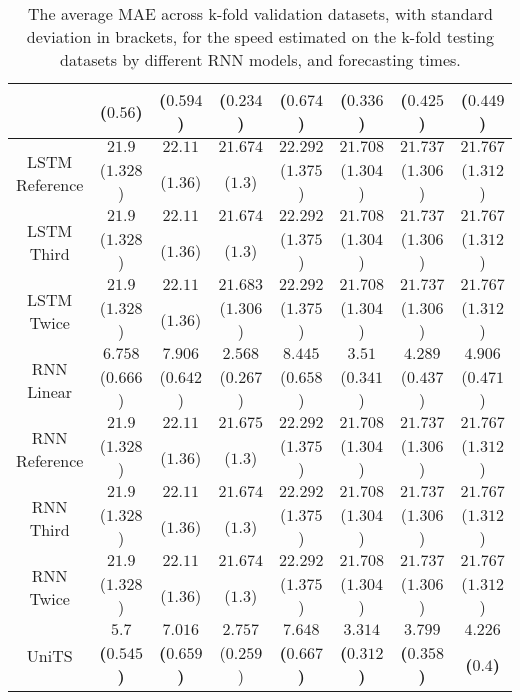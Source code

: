 \begin{table}[!ht]
{\begin{tabular}{|c|c|c|c|c|c|c|c|}
			 & ($0.56$) & ($0.594$) & \textbf{(}$\mathbf{0.234}$\textbf{)} & ($0.674$) & ($0.336$) & ($0.425$) & ($0.449$) \\ \hline
			\multirow{2}{*}{LSTM Reference} & $21.9$ & $22.11$ & $21.674$ & $22.292$ & $21.708$ & $21.737$ & $21.767$ \\
			 & ($1.328$) & ($1.36$) & ($1.3$) & ($1.375$) & ($1.304$) & ($1.306$) & ($1.312$) \\ \hline
			\multirow{2}{*}{LSTM Third} & $21.9$ & $22.11$ & $21.674$ & $22.292$ & $21.708$ & $21.737$ & $21.767$ \\
			 & ($1.328$) & ($1.36$) & ($1.3$) & ($1.375$) & ($1.304$) & ($1.306$) & ($1.312$) \\ \hline
			\multirow{2}{*}{LSTM Twice} & $21.9$ & $22.11$ & $21.683$ & $22.292$ & $21.708$ & $21.737$ & $21.767$ \\
			 & ($1.328$) & ($1.36$) & ($1.306$) & ($1.375$) & ($1.304$) & ($1.306$) & ($1.312$) \\ \hline
			\multirow{2}{*}{RNN Linear} & $6.758$ & $7.906$ & $2.568$ & $8.445$ & $3.51$ & $4.289$ & $4.906$ \\
			 & ($0.666$) & ($0.642$) & ($0.267$) & ($0.658$) & ($0.341$) & ($0.437$) & ($0.471$) \\ \hline
			\multirow{2}{*}{RNN Reference} & $21.9$ & $22.11$ & $21.675$ & $22.292$ & $21.708$ & $21.737$ & $21.767$ \\
			 & ($1.328$) & ($1.36$) & ($1.3$) & ($1.375$) & ($1.304$) & ($1.306$) & ($1.312$) \\ \hline
			\multirow{2}{*}{RNN Third} & $21.9$ & $22.11$ & $21.674$ & $22.292$ & $21.708$ & $21.737$ & $21.767$ \\
			 & ($1.328$) & ($1.36$) & ($1.3$) & ($1.375$) & ($1.304$) & ($1.306$) & ($1.312$) \\ \hline
			\multirow{2}{*}{RNN Twice} & $21.9$ & $22.11$ & $21.674$ & $22.292$ & $21.708$ & $21.737$ & $21.767$ \\
			 & ($1.328$) & ($1.36$) & ($1.3$) & ($1.375$) & ($1.304$) & ($1.306$) & ($1.312$) \\ \hline
			\multirow{2}{*}{UniTS} & $\mathbf{5.7}$ & $\mathbf{7.016}$ & $2.757$ & $\mathbf{7.648}$ & $\mathbf{3.314}$ & $\mathbf{3.799}$ & $\mathbf{4.226}$ \\
			 & \textbf{(}$\mathbf{0.545}$\textbf{)} & \textbf{(}$\mathbf{0.659}$\textbf{)} & ($0.259$) & \textbf{(}$\mathbf{0.667}$\textbf{)} & \textbf{(}$\mathbf{0.312}$\textbf{)} & \textbf{(}$\mathbf{0.358}$\textbf{)} & \textbf{(}$\mathbf{0.4}$\textbf{)} \\ \hline
		\end{tabular}
	}
	\caption{The average MAE across k-fold validation datasets, with standard deviation in brackets, for the speed estimated on the k-fold testing datasets by different RNN models, and forecasting times.}
	\label{tab:all_speed_MAE}
\end{table}

